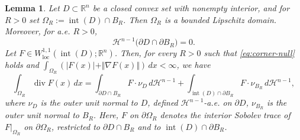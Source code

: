 \documentclass[11pt]{amsart}
\newcommand{\1}{\mathds{1}}
\newtheorem{lemma}[theorem]{Lemma}
\theoremstyle{definition}
\theoremstyle{remark}
\theoremstyle{definition}
\begin{document}
\begin{lemma}\label{co-area}
Let $D\subset \mathbb{R}^n$ be a closed convex set with nonempty interior, and for $R>0$ set $\Omega_R:=\operatorname{int}(D)\cap B_R$. Then $\Omega_R$ is a bounded Lipschitz domain. Moreover, for a.e. $R>0$,  
\begin{equation}\label{eq:corner-null}
\mathcal{H}^{n-1}\big(\partial D\cap \partial B_R\big)=0.    
\end{equation}
Let $F\in W^{1,1}_{\operatorname{loc}}(\operatorname{int}(D);\mathbb{R}^n)$. Then, for every $R>0$ such that \eqref{eq:corner-null} holds and $\int_{\Omega_{R}}(\vert F(x)\vert +\Vert \nabla F(x)\Vert)\,dx<\infty$, we have
\begin{equation*}
\int_{\Omega_R}\operatorname{div}F(x)\,dx
=
\int_{\partial D\cap B_R}F\cdot \nu_D\,d\mathcal{H}^{n-1}
+
\int_{\operatorname{int}(D)\cap \partial B_R} F\cdot \nu_{B_R}\,d\mathcal{H}^{n-1},
\end{equation*}
where $\nu_D$ is the outer unit normal to $D$, defined $\mathcal{H}^{n-1}$-a.e. on $\partial D$,
$\nu_{B_R}$ is the outer unit normal to $B_R$. Here, $F$ on $\partial\Omega_R$ denotes the \emph{interior} Sobolev trace of $F|_{\Omega_R}$ on $\partial\Omega_R$,
restricted to $\partial D\cap B_R$ and to $\operatorname{int}(D)\cap \partial B_R$.
\end{lemma}
\end{document}
